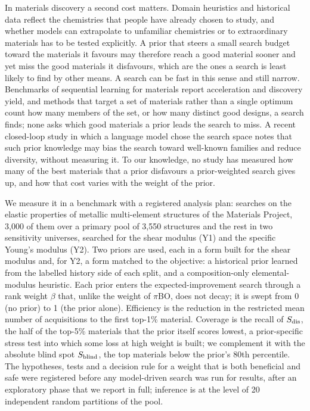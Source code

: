 In materials discovery a second cost matters. Domain heuristics and historical data reflect the chemistries that people have
already chosen to study\cite{jia2019anthropogenic}, and whether models can extrapolate to unfamiliar chemistries or to extraordinary materials has to be
tested explicitly\cite{meredig2018loco,kauwe2020extraordinary}. A prior that steers a small search budget toward the materials it
favours may therefore reach a good material sooner and yet miss the good materials it disfavours, which are the ones a search is
least likely to find by other means. A search can be fast in this sense and still narrow. Benchmarks of sequential learning for
materials report acceleration and discovery yield\cite{rohr2020benchmarking,liang2021benchmarking,borg2023quantifying}, and methods
that target a set of materials rather than a single optimum count how many members of the set, or how many distinct good designs,
a search finds\cite{chitturi2024bax,jiang2026rangeaware}; none asks which good materials a prior leads the search to miss. A recent
closed-loop study in which a language model chose the search space notes that such prior knowledge may bias the search toward
well-known families and reduce diversity, without measuring it\cite{iwasaki2026llmspace}. To our knowledge, no study
has measured how many of the best materials that a prior disfavours a prior-weighted search gives up, and how that cost varies
with the weight of the prior.

We measure it in a benchmark with a registered analysis plan\cite{asad2026registrationv1,asad2026registration}:  searches on the
elastic properties of metallic multi-element structures of the Materials Project\cite{jain2013materialsproject,
dejong2015charting}, 3,000 of them over a primary pool of 3,550 structures and the rest in two sensitivity universes, searched for the shear modulus (Y1) and the specific Young's modulus (Y2). Two priors are used, each in a
form built for the shear modulus and, for Y2, a form matched to the objective: a historical prior learned from the labelled
history side of each split, and a composition-only elemental-modulus heuristic. Each prior enters the expected-improvement search
through a rank weight $\beta$ that, unlike the weight of $\pi$BO, does not decay; it is swept from 0 (no prior) to 1 (the prior
alone). Efficiency is the reduction in the restricted mean number of acquisitions to the first top-1\% material. Coverage is the
recall of $S_{\mathrm{dis}}$, the half of the top-5\% materials that the prior itself scores lowest, a prior-specific stress test into which some
loss at high weight is built; we complement it with the absolute blind spot $S_{\mathrm{blind}}$, the top materials below the prior's 80th
percentile. The hypotheses, tests and
a decision rule for a weight that is both beneficial and safe were registered before any model-driven search was run for
results\cite{nosek2018preregistration}, after an exploratory phase that we report in full; inference is at the level of 20
independent random partitions of the pool\cite{bouthillier2021variance}.

